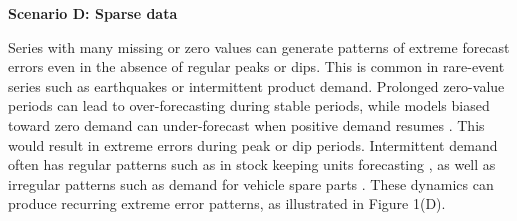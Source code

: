 \documentclass[12pt]{article}
\newenvironment{scenario}[1]{%
  \par\vspace{1ex}\noindent\textbf{#1}\par\vspace{0.5ex}}{\par}
\begin{document}

\begin{scenario}{Scenario D: Sparse data}

Series with many missing or zero values can generate patterns of extreme forecast errors even in the absence of regular peaks or dips. This is common in rare-event series %
such as earthquakes or intermittent product demand. Prolonged zero-value periods can lead to over-forecasting during stable periods, while models biased toward zero demand can under-forecast when positive demand resumes \citep{wang2024b}. This would result in extreme errors during peak or dip periods. Intermittent demand often has regular patterns such as in stock keeping units forecasting \citep{nikolopoulos2021}, as well as irregular patterns %
such as demand for vehicle spare parts \citep{jiang2021}. These dynamics can produce recurring extreme error patterns, as illustrated in Figure 1(D).
\end{scenario}
\end{document}
